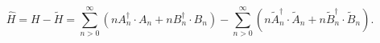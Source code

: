 \begin{equation}
\hat{H} = H-\tilde{H}=
\sum_{n>0}^{\infty }\left( nA_{n}^{\dagger }\cdot
A_{n}+nB_{n}^{\dagger }\cdot B_{n}\right) -\sum_{n>0}^{\infty
}\left( n\tilde{A}_{n}^{\dagger }\cdot \tilde{A}_{n}+n
\tilde{B}_{n}^{\dagger }\cdot \tilde{B}_{n}\right).
\end{equation}

